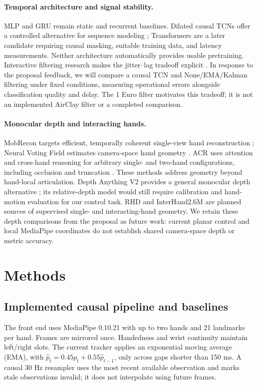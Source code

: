 \documentclass{article}
\begin{document}
\paragraph{Temporal architecture and signal stability.}
MLP and GRU remain static and recurrent baselines. Dilated causal TCNs offer a
controlled alternative for sequence modeling \citep{bai2018}; Transformers
\citep{vaswani2017} are a later candidate requiring causal masking, suitable training
data, and latency measurements. Neither architecture automatically provides usable
pretraining. Interactive filtering research makes the jitter--lag tradeoff explicit
\citep{casiez2012}. In response to the proposal feedback, we will compare a causal
TCN and None/EMA/Kalman filtering under fixed conditions, measuring operational
errors alongside classification quality and delay. The 1 Euro filter motivates this
tradeoff; it is not an implemented AirClay filter or a completed comparison.

\paragraph{Monocular depth and interacting hands.}
MobRecon targets efficient, temporally coherent single-view hand reconstruction
\citep{chen2022mobrecon}; Neural Voting Field estimates camera-space hand geometry
\citep{huang2023}. ACR uses attention and cross-hand reasoning for arbitrary
single- and two-hand configurations, including occlusion and truncation
\citep{yu2023acr}. These methods address geometry beyond hand-local articulation.
Depth Anything V2 provides a general monocular depth alternative
\citep{yang2024depthanything}; its relative-depth model would still require
calibration and hand-motion evaluation for our control task. RHD
\citep{zimmermann2017hand} and InterHand2.6M \citep{moon2020interhand} are planned
sources of supervised single- and interacting-hand geometry. We retain these depth
comparisons from the proposal as future work: current planar control and local
MediaPipe coordinates do not establish shared camera-space depth or metric accuracy.

\section{Methods}
\subsection{Implemented causal pipeline and baselines}\label{sec:baseline}
The front end uses MediaPipe 0.10.21 with up to two hands and 21 landmarks per hand.
Frames are mirrored once. Handedness and wrist continuity maintain left/right slots.
The current tracker applies an exponential moving average (EMA), with
$\hat p_t=0.45p_t+0.55\hat p_{t-1}$, only across gaps shorter than 150 ms.
A causal 30 Hz resampler uses the most recent available observation and marks stale
observations invalid; it does not interpolate using future frames.
\end{document}
